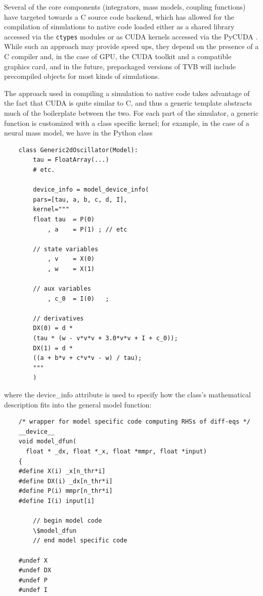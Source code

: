 	Several of the core components (integrators, mass models, coupling
	functions) have targeted towards a C source code backend, which has
	allowed for the compilation of simulations to native code loaded 
	either as a shared library accessed via the \texttt{ctypes} modules
	or as CUDA kernels accessed via the PyCUDA \cite{PyCUDA}.
	While such an approach may provide speed ups, they depend on the
	presence of a C compiler and, in the case of GPU, the CUDA toolkit and
	a compatible graphics card, and in the future, prepackaged versions of TVB
	will include precompiled objects for most kinds of simulations. 

	The approach used in compiling a simulation to native code takes advantage
	of the fact that CUDA is quite similar to C, and thus a generic template
	abstracts much of the boilerplate between the two. For each part of the 
	simulator, a generic function is customized with a class specific kernel;
	for example, in the case of a neural mass model, we have in the Python class

	\begin{lstlisting}
	class Generic2dOscillator(Model):
		tau = FloatArray(...)
		# etc.

		device_info = model_device_info(
		pars=[tau, a, b, c, d, I],
		kernel="""
		float tau  = P(0)
			, a    = P(1) ; // etc

		// state variables
			, v    = X(0)
			, w    = X(1)

		// aux variables
			, c_0  = I(0)   ;

		// derivatives
		DX(0) = d * 
		(tau * (w - v*v*v + 3.0*v*v + I + c_0));
		DX(1) = d * 
		((a + b*v + c*v*v - w) / tau);
		"""
		)
	\end{lstlisting}

	\noindent where the device\_info attribute is used to specify how the
	class's mathematical description fits into the general model function:

	\begin{lstlisting}
	/* wrapper for model specific code computing RHSs of diff-eqs */
	__device__
	void model_dfun(
	  float * _dx, float *_x, float *mmpr, float *input)
	{
	#define X(i) _x[n_thr*i]
	#define DX(i) _dx[n_thr*i]
	#define P(i) mmpr[n_thr*i]
	#define I(i) input[i]

		// begin model code
		\$model_dfun
		// end model specific code

	#undef X
	#undef DX
	#undef P
	#undef I
	\end{lstlisting}

